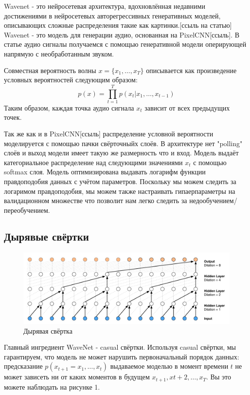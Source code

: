 \documentclass[../diploma.tex]{subfiles}
\begin{document}
Wavenet - это нейросетевая архитектура, вдохновлённая недавними достижениями в нейросетевых авторегрессивных генеративных моделей, описывающих сложные распределения такие как картинки.[ссыль на статью] Wavenet - это модель для генерации аудио, основанная на PixelCNN[ссыль].
В статье аудио сигналы получаемся с помощью генеративной модели оперирующей напрямую с необработанным звуком. 

Совместная вероятность волны $x = \{ x_1, \dots, x_T \}$ описывается как произведение условных вероятностей следующим образом:
$$
p(x) = \prod^{T}_{t=1}{} p(x_t|x_1, \dots, x_{t-1})
$$
Таким образом, каждая точка аудио сигнала $x_t$ зависит от всех предыдущих точек.

Так же как и в PixelCNN[ссыль] распределение условной вероятности моделируется с помощью пачки свёрточныйх слоёв. В архитектуре нет "polling" слоёв и выход модели имеет такую же размерность что и вход. Модель выдаёт категориальное распределение над следующими значениями $x_t$ с помощью softmax слоя. Модель оптимизирована выдавать логарифм функции правдоподобия данных с учётом параметров. Поскольку мы можем следить за логаримом правдоподобия, мы можем также настраивать гипаерпараметры на валидационном множестве что позволит нам легко следить за недообучением/переобучением. 

\newpage
\subsection{Дырявые свёртки}

\begin{figure}[h!]
  \includegraphics[scale=0.3]{img/casual_dilated}
  \caption{Дырявая свёртка}
  \label{fig:casual_dilated}
\end{figure}

Главный ингредиент WaveNet - casual свёртки. Используя casual свёртки, мы гарантируем, что модель не может нарушить первоначальный порядок данных: предсказание $p(x_{t+1} = x_1, \dots, x_{t})$ выдаваемое моделью в момент времени $t$ не может зависеть ни от каких моментов в будущем $x_{t+1}, x{t+2}, \dots, x_{T}$. Вы это можете наблюдать на рисунке 1.
\end{document}
